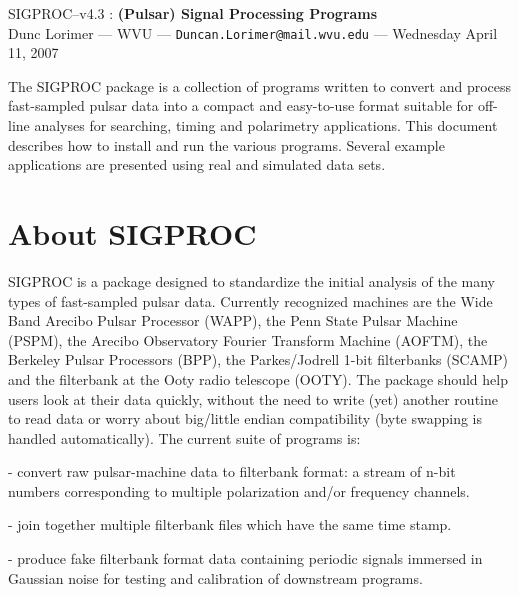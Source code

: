 \documentclass[11pt]{article}
\begin{document}
\begin{center}
{\LARGE {\sc SIGPROC--v4.3} : {\bf (Pulsar) Signal Processing Programs}}\\
\bigskip
\bigskip
{\large Dunc Lorimer --- WVU --- {\tt Duncan.Lorimer@mail.wvu.edu} --- Wednesday April 11, 2007}
\end{center}
 The SIGPROC package is a collection of
programs written to convert and process fast-sampled pulsar data into
a compact and easy-to-use format suitable for off-line analyses for
searching, timing and polarimetry applications. This document
describes how to install and run the various programs. Several example
applications are presented using real and simulated data sets.
\tableofcontents

\clearpage
\section{About SIGPROC}

SIGPROC is a package designed to standardize the initial analysis of
the many types of fast-sampled pulsar data. Currently recognized
machines are the Wide Band Arecibo Pulsar Processor (WAPP), the Penn
State Pulsar Machine (PSPM), the Arecibo Observatory Fourier Transform
Machine (AOFTM), the Berkeley Pulsar Processors (BPP), the Parkes/Jodrell
1-bit filterbanks (SCAMP) and the
filterbank at the Ooty radio telescope (OOTY). The package
should help users look at their data quickly, without the need to
write (yet) another routine to read data or worry about big/little
  
endian compatibility (byte swapping is handled automatically).  The
current suite of programs is:

\bigskip
{} - convert raw pulsar-machine data to 
filterbank format: a stream of n-bit numbers corresponding to multiple
polarization and/or frequency channels. 

\smallskip
{} - join together multiple filterbank
files which have the same time stamp.

\smallskip
{} - produce fake filterbank format data
containing periodic signals immersed in Gaussian noise for
testing and calibration of downstream programs.
\end{document}

